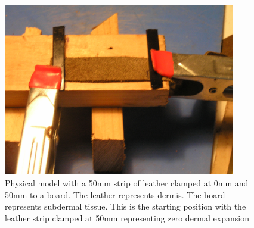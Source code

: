 %

\begin{figure}[!h]
  \centering
   \includegraphics[width=0.9\textwidth]{images/P1010001.JPG}
  \caption{Physical model with a 50mm strip of leather clamped at 0mm and 50mm to a board. The leather represents dermis. The board represents subdermal tissue. This is the starting position with the leather strip clamped at 50mm representing zero dermal expansion}
  \label{fig:model1}
\end{figure}

%

